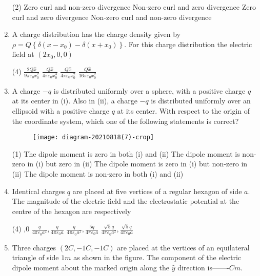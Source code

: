 \begin{enumerate}[label=\color{ocre}\textbf{\arabic*.}]
\begin{tasks}(2)
\task[\textbf{A.}] Zero curl and non-zero divergence
\task[\textbf{B.}] Non-zero curl and zero divergence
\task[\textbf{C.}] Zero curl and zero divergence
\task[\textbf{D.}]  Non-zero curl and non-zero divergence
\end{tasks}
\item A charge distribution has the charge density given by $\rho=Q\left\{\delta\left(x-x_{0}\right)-\delta\left(x+x_{0}\right)\right\}$. For
this charge distribution the electric field at $\left(2 x_{0}, 0,0\right)$
{}

\begin{tasks}(4)
	\task[\textbf{A.}] $\frac{2 Q \hat{x}}{9 \pi \varepsilon_{0} x_{0}^{2}}$
	\task[\textbf{B.}] $\frac{Q \hat{x}}{4 \pi \varepsilon_{0} x_{0}^{3}}$
	\task[\textbf{C.}] $\frac{Q \hat{x}}{4 \pi \varepsilon_{0} x_{0}^{2}}$
	\task[\textbf{D.}] $\frac{Q \hat{x}}{16 \pi \varepsilon_{0} x_{0}^{2}}$
\end{tasks}
\item A charge $-q$ is distributed uniformly over a sphere, with a positive charge $q$ at its center in (i). Also in (ii), a charge $-q$ is distributed uniformly over an ellipsoid with a positive charge $q$ at its center. With respect to the origin of the coordinate system, which one of the following statements is correct?
{}

\begin{figure}[H]
	\centering
	\texttt{[image: diagram-20210818(7)-crop]}
\end{figure}
\begin{tasks}(1)
	\task[\textbf{A.}] The dipole moment is zero in both (i) and (ii)
	\task[\textbf{B.}] The dipole moment is non-zero in (i) but zero in (ii)
	\task[\textbf{C.}] The dipole moment is zero in (i) but non-zero in (ii)
	\task[\textbf{D.}] The dipole moment is non-zero in both (i) and (ii)
\end{tasks}
\item Identical charges $q$ are placed at five vertices of a regular hexagon of side $a$. The magnitude of the electric field and the electrostatic potential at the centre of the hexagon are respectively
{}

\begin{tasks}(4)
	,0
	\task[\textbf{B.}] $\frac{q}{4 \pi \varepsilon_{0} a^{2}}, \frac{q}{4 \pi \varepsilon_{0} a}$
	\task[\textbf{C.}] $\frac{q}{4 \pi \varepsilon_{0} a^{2}}, \frac{5 q}{4 \pi \varepsilon_{0} a}$
	\task[\textbf{D.}]  $\frac{\sqrt{5} q}{4 \pi \varepsilon_{0} a^{2}}, \frac{\sqrt{5} q}{4 \pi \varepsilon_{0} a}$
\end{tasks}
\item Three charges $(2 C,-1 C,-1 C)$ are placed at the vertices of an equilateral triangle of side $1 m$ as shown in the figure. The component of the electric dipole moment about the marked origin along the $\hat{y}$ direction is-------$C m$.
{}


\end{enumerate}
